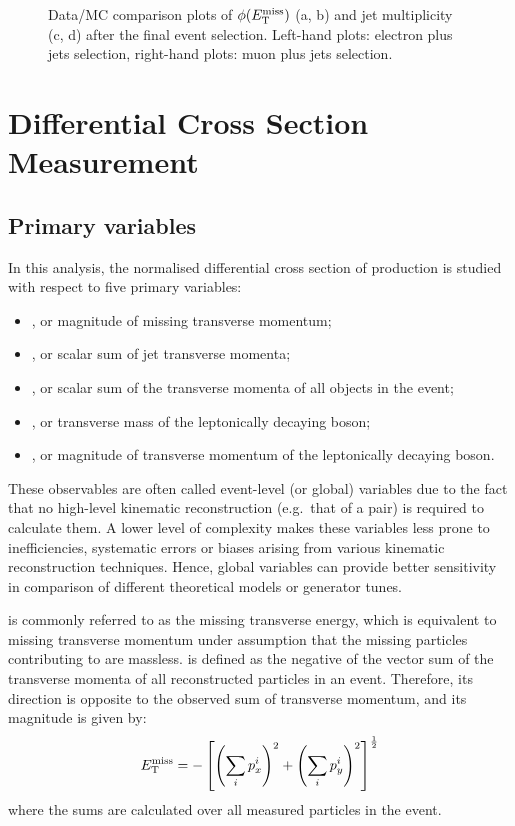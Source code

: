 \begin{figure}[htbp]
    \caption[Data/MC comparison plots of $\phi(\MET)$ and jet multiplicity after the final event selection]{Data/MC
    comparison plots of $\phi(\MET)$ (a, b) and jet multiplicity (c, d) after the final event selection. Left-hand
    plots: electron plus jets selection, right-hand plots: muon plus jets selection.}
    \label{fig:contol_plots_phiMET_NJets}
\end{figure}

\newpage

\section{Differential Cross Section Measurement}
\label{s_xsection:measurement}

\subsection{Primary variables}
\label{ss_xsection:variables}

In this analysis, the normalised differential cross section of \ttbar production is studied with respect to five primary
variables:

\begin{itemize}
	\item \MET, or magnitude of missing transverse momentum;
	\item \HT, or scalar sum of jet transverse momenta;
	\item \ST, or scalar sum of the transverse momenta of all objects in the event;
	\item \MT, or transverse mass of the leptonically decaying \W boson;
	\item \WPT, or magnitude of transverse momentum of the leptonically decaying \W boson.
\end{itemize}

These observables are often called event-level (or global) variables due to the fact that no high-level kinematic
reconstruction (e.g.\ that of a \ttbar pair) is required to calculate them. A lower level of complexity makes these
variables less prone to inefficiencies, systematic errors or biases arising from various kinematic reconstruction
techniques. Hence, global variables can provide better sensitivity in comparison of different theoretical models or
generator tunes.

\METvec is commonly referred to as the missing transverse energy, which is equivalent to missing transverse momentum
under assumption that the missing particles contributing to \METvec are massless. \METvec is defined as the negative of
the vector sum of the transverse momenta of all reconstructed particles in an event. Therefore, its direction is
opposite to the observed sum of transverse momentum, and its magnitude \MET is given by:
\[ E_{\mathrm{T}}^{\textrm{miss}} = - \left[ \left(\sum_i{p_{x}^i}\right)^2 + \left(\sum_i{p_{y}^i}\right)^2 \right]^{\frac{1}{2}}\]
where the sums are calculated over all measured particles in the event.

